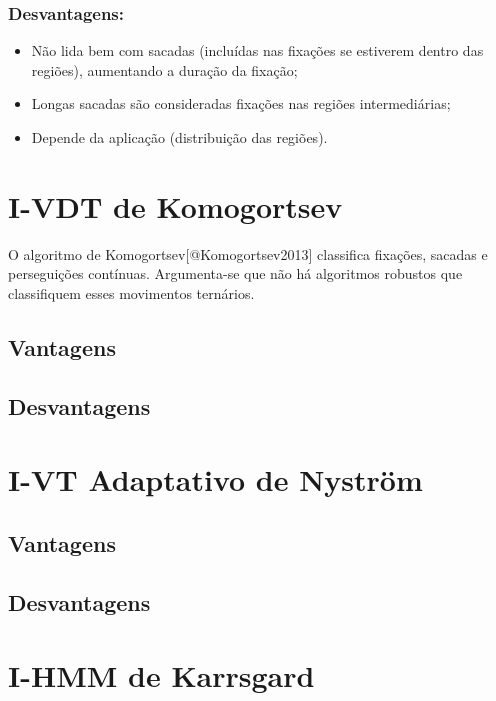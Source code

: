 \subsubsection{Desvantagens:}\label{desvantagens-4}

\begin{itemize}
\itemsep1pt\parskip0pt
\item
  Não lida bem com sacadas (incluídas nas fixações se estiverem dentro
  das regiões), aumentando a duração da fixação;
\item
  Longas sacadas são consideradas fixações nas regiões intermediárias;
\item
  Depende da aplicação (distribuição das regiões).
\end{itemize}

\section{I-VDT de Komogortsev}\label{i-vdt-de-komogortsev}

O algoritmo de Komogortsev{[}@Komogortsev2013{]} classifica fixações,
sacadas e perseguições contínuas. Argumenta-se que não há algoritmos
robustos que classifiquem esses movimentos ternários.

\subsection{Vantagens}\label{vantagens-5}

\subsection{Desvantagens}\label{desvantagens-5}

\section{I-VT Adaptativo de
Nyström}\label{i-vt-adaptativo-de-nystruxf6m}

\subsection{Vantagens}\label{vantagens-6}

\subsection{Desvantagens}\label{desvantagens-6}

\section{I-HMM de Karrsgard}\label{i-hmm-de-karrsgard}

